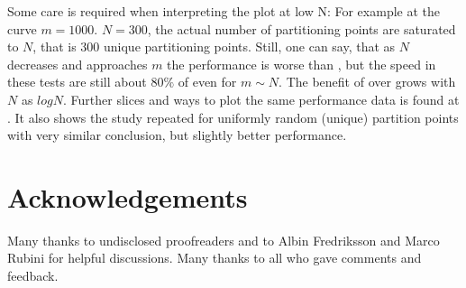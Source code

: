 Some care is required when interpreting the plot at low N: For example at the curve $m=1000$. $N=300$, the actual number of partitioning points are saturated to $N$, that is $300$ unique partitioning points. Still, one can say, that as $N$ decreases and approaches $m$ the performance is worse than , but the speed in these tests are still about $80\%$ of  even for $m \sim N$. The benefit of  over  grows with $N$ as $log N$. Further slices and ways to plot the same performance data is found at \cite{p2375RefImpl}. It also shows the study repeated for uniformly random (unique) partition points with very similar conclusion, but slightly better performance.


\section*{Acknowledgements}

Many thanks to undisclosed proofreaders and to 
Albin Fredriksson and Marco Rubini for helpful discussions. Many thanks to all who gave comments and feedback.

\renewcommand{\bibname}{References}




